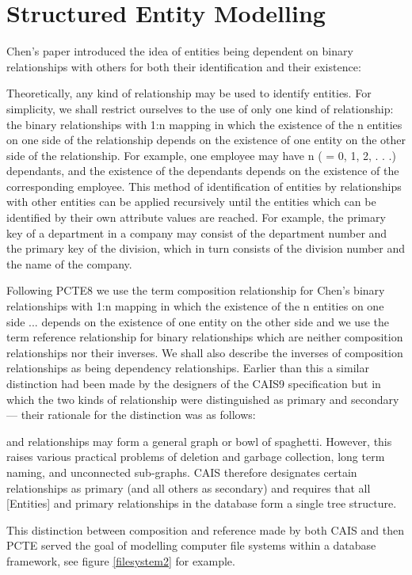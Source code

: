 \section{Structured Entity Modelling}
\label{StructuredEntityModelling}
Chen's paper introduced the idea of entities being dependent on binary relationships with others for both their identification and their existence:
\begin{erquote}
Theoretically, any kind of relationship may be used to identify entities. For simplicity, we shall restrict ourselves to the use of only one kind of relationship: the binary relationships with 1:n mapping in which the existence of the n entities on one side of the relationship depends on the existence of one entity on the other side of the relationship. For example, one employee may have n ( = 0, 1, 2, . . .) dependants, and the existence of the dependants depends on the existence of the corresponding employee. This method of identification of entities by relationships with other entities can be applied recursively until the entities which can be identified by their own attribute values are reached. For example, the primary key of a department in a company may consist of the department number and the primary key of the division, which in turn consists of the division number and the name of the company.
\end{erquote}

Following PCTE8 we use the term composition relationship for Chen's binary relationships with 1:n mapping in which the existence of the n entities on one side ... depends on the existence of one entity on the other side and we use the term reference relationship for binary relationships which are neither composition relationships nor their inverses. We shall also describe the inverses of composition relationships as being dependency relationships. Earlier than this a similar distinction had been made by the designers of the CAIS9 specification but in which the two kinds of relationship were distinguished as primary and secondary — their rationale for the distinction was as follows:
\begin{erquote}
[Entities] and relationships may form a general graph or bowl of spaghetti. However, this raises various practical problems of deletion and garbage collection, long term naming, and unconnected sub-graphs. CAIS therefore designates certain relationships as primary (and all others as secondary) and requires that all [Entities] and primary relationships in the database form a single tree structure.
\end{erquote}
This distinction between composition and reference made by both CAIS and then PCTE served the goal of modelling computer file systems within a database framework, see figure \ref{filesystem2} for example.

